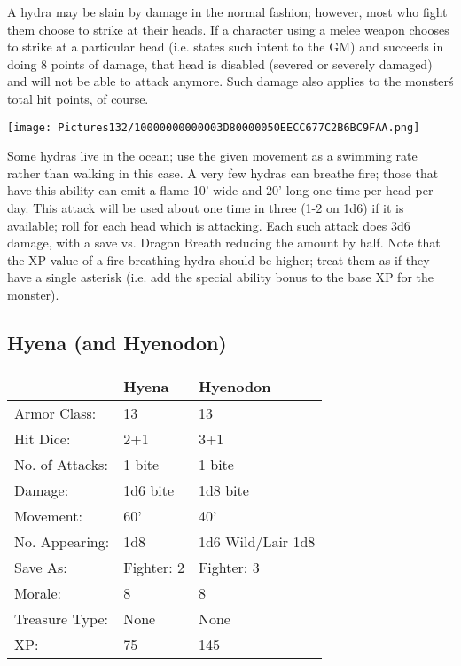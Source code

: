 \documentclass[a4paper,twoside,openany,10pt]{book}
\begin{document}
\begin{multicols}{2}
A hydra may be slain by damage in the normal fashion; however, most who fight them choose to strike at their heads. If a character using a melee weapon chooses to strike at a particular head (i.e. states such intent to the GM) and succeeds in doing 8 points of damage, that head is disabled (severed or severely damaged) and will not be able to attack anymore. Such damage also applies to the monster\'s total hit points, of course.

\begin{center}
	\texttt{[image: Pictures132/10000000000003D80000050EECC677C2B6BC9FAA.png]}
\end{center}

Some hydras live in the ocean; use the given movement as a swimming rate rather than walking in this case. A very few hydras can breathe fire; those that have this ability can emit a flame 10' wide and 20' long one time per head per day. This attack will be used about one time in three (1-2 on 1d6) if it is available; roll for each head which is attacking. Each such attack does 3d6 damage, with a save vs. Dragon Breath reducing the amount by half. Note that the XP value of a fire-breathing hydra should be higher; treat them as if they have a single asterisk (i.e. add the special ability bonus to the base XP for the monster).


\subsection*{Hyena (and Hyenodon)}\label{hyena-and-hyenodon}

\begin{tabularx}{0.50\textwidth}{@{}llX@{}}
& Hyena & Hyenodon \\\hline
Armor Class: & 13 & 13 \\\hline
Hit Dice: & 2+1 & 3+1 \\\hline
No. of Attacks: & 1 bite & 1 bite \\\hline
Damage: & 1d6 bite & 1d8 bite \\\hline
Movement: & 60' & 40' \\\hline
No. Appearing: & 1d8 & 1d6 Wild/Lair 1d8 \\\hline
Save As: & Fighter: 2 & Fighter: 3 \\\hline
Morale: & 8 & 8 \\\hline
Treasure Type: & None & None \\\hline
XP: & 75 & 145 \\\hline
\end{tabularx}\medskip


\end{multicols}
\end{document}
